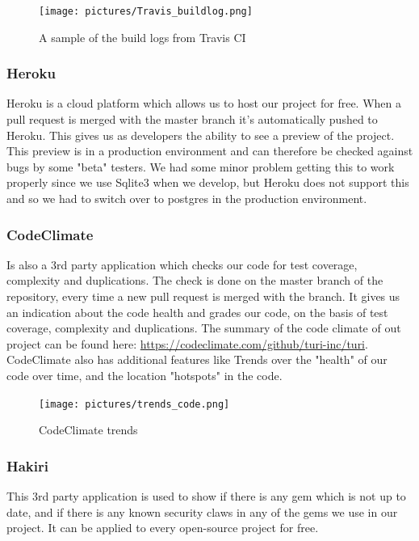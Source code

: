 \documentclass[a4paper]{article}
\begin{document}
\begin{figure}[!h]
  \begin{center}
    \texttt{[image: pictures/Travis\_buildlog.png]}
    \caption{A sample of the build logs from Travis CI}
    \label{fig:travis_log}
  \end{center}
\end{figure}


\subsubsection{Heroku}
Heroku is a cloud platform which allows us to host our project for free. When a pull request is merged with the master branch it's automatically pushed to Heroku. This gives us as developers the ability to see a preview of the project. This preview is in a production environment and can therefore be checked against bugs by some "beta" testers. We had some minor problem getting this to work properly since we use Sqlite3 when we develop, but Heroku does not support this and so we had to switch over to postgres in the production environment.

\subsubsection{CodeClimate}
Is also a 3rd party application which checks our code for test coverage, complexity and duplications. The check is done on the master branch of the repository, every time a new pull request is merged with the branch. It gives us an indication about the code health and grades our code, on the basis of test coverage, complexity and duplications. The summary of the code climate of out project can be found here: \url{https://codeclimate.com/github/turi-inc/turi}. \\
CodeClimate also has additional features like Trends over the "health" of our code over time, and the location "hotspots" in the code.  

\begin{figure}[!h]
  \begin{center}
    \texttt{[image: pictures/trends\_code.png]}
    \caption{CodeClimate trends}
    \label{fig:codeclimate}
  \end{center}
\end{figure}

\subsubsection{Hakiri}
This 3rd party application is used to show if there is any gem which is not up to date, and if there is any known security claws in any of the gems we use in our project. It can be applied to every open-source project for free.
\end{document}
